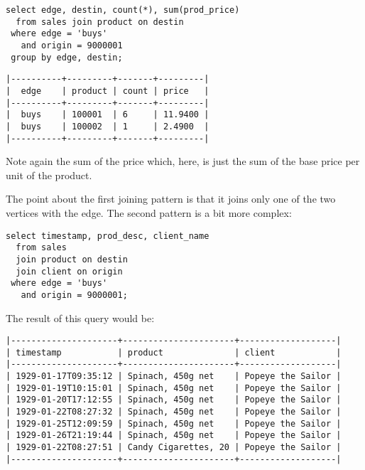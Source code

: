 \begin{sqlcode}
\begin{lstlisting}
select edge, destin, count(*), sum(prod_price)
  from sales join product on destin
 where edge = 'buys'
   and origin = 9000001
 group by edge, destin;
\end{lstlisting}
\end{sqlcode}

\begin{minipage}{\textwidth}
\begin{verbatim}
|----------+---------+-------+---------|
|  edge    | product | count | price   |
|----------+---------+-------+---------|
|  buys    | 100001  | 6     | 11.9400 |
|  buys    | 100002  | 1     | 2.4900  |
|----------+---------+-------+---------|
\end{verbatim}
\end{minipage}

Note again the sum of the price which, here,
is just the sum of the base price per unit of the product.

The point about the first joining pattern
is that it joins only one of the two vertices
with the edge. The second pattern is a bit more complex:

\begin{sqlcode}
\begin{lstlisting}
select timestamp, prod_desc, client_name
  from sales
  join product on destin
  join client on origin
 where edge = 'buys'
   and origin = 9000001;
\end{lstlisting}
\end{sqlcode}

The result of this query would be:

\begin{minipage}{\textwidth}
\begin{verbatim}
|---------------------+----------------------+-------------------|
| timestamp           | product              | client            |
|---------------------+----------------------+-------------------|
| 1929-01-17T09:35:12 | Spinach, 450g net    | Popeye the Sailor |
| 1929-01-19T10:15:01 | Spinach, 450g net    | Popeye the Sailor |
| 1929-01-20T17:12:55 | Spinach, 450g net    | Popeye the Sailor |
| 1929-01-22T08:27:32 | Spinach, 450g net    | Popeye the Sailor |
| 1929-01-25T12:09:59 | Spinach, 450g net    | Popeye the Sailor |
| 1929-01-26T21:19:44 | Spinach, 450g net    | Popeye the Sailor |
| 1929-01-22T08:27:51 | Candy Cigarettes, 20 | Popeye the Sailor |
|---------------------+----------------------+-------------------|
\end{verbatim}
\end{minipage}

